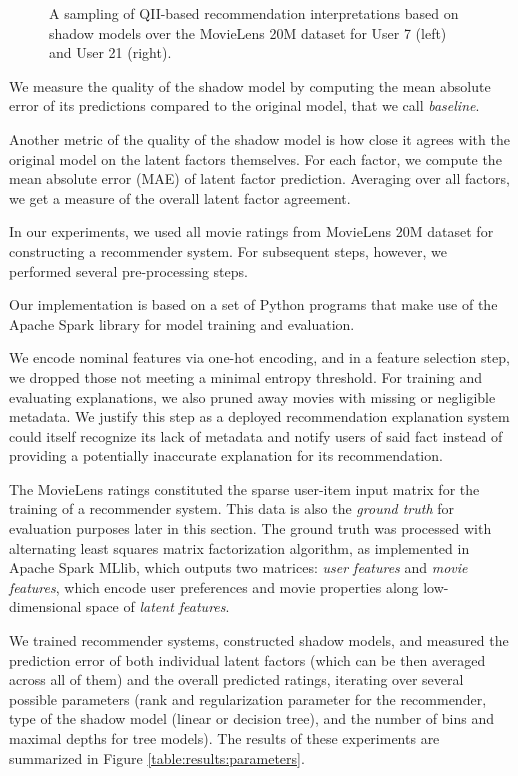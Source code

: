 \begin{figure}[t!]
  \caption{\label{fig:results:qii}A sampling of QII-based
    recommendation interpretations based on shadow models over the
    MovieLens 20M dataset for User 7 (left) and User 21 (right).
  }
\end{figure}


We measure the quality of the shadow model by computing the mean
absolute error of its predictions compared to the original model,
that we call \emph{baseline}.

Another metric of the quality of the shadow model is how close it
agrees with the original model on the latent factors themselves.
For each factor, we compute the mean absolute error (MAE) of latent
factor prediction. 
Averaging over all factors, we get a measure of the overall latent
factor agreement.

In our experiments, we used all movie ratings from MovieLens 20M dataset for constructing
a recommender system. 
For subsequent steps, however, we performed several pre-processing
steps.

Our implementation is based on a set of Python programs that make use
of the Apache Spark library for model training and evaluation.

We encode nominal features via one-hot encoding, and in a feature
selection step, we dropped those not meeting a minimal entropy
threshold.
For training and evaluating explanations, we also pruned away movies
with missing or negligible metadata. 
We justify this step as a deployed recommendation explanation system
could itself recognize its lack of metadata and notify users of said
fact instead of providing a potentially inaccurate explanation for its
recommendation.

The MovieLens ratings constituted the sparse user-item input matrix
for the training of a recommender system.
This data is also the \emph{ground truth} for evaluation purposes
later in this section.
The ground truth was processed with alternating least squares matrix
factorization algorithm, as implemented in Apache Spark MLlib, which
outputs two matrices: \emph{user features} and \emph{movie features},
which encode user preferences and movie properties along
low-dimensional space of \emph{latent features}. 

We trained recommender systems, constructed shadow models, and
measured the prediction error of both individual
latent factors (which can be then averaged across all of them)
and the overall predicted ratings, iterating over
several possible parameters (rank and regularization parameter for the
recommender, type of the shadow model (linear or decision tree), and
the number of bins and maximal depths for tree models). The results of
these experiments are summarized in Figure
\ref{table:results:parameters}.


